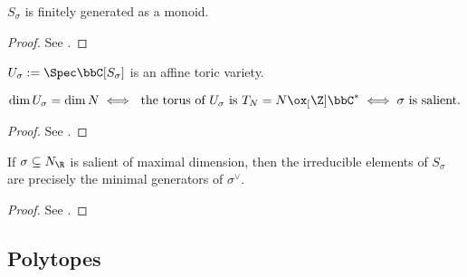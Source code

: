 \begin{proposition}
  \label{07-gordan-lemma}

  $S_\sigma$ is finitely generated as a monoid.
\end{proposition}
\begin{proof}

  See \cite{Cox_2011}.
\end{proof}


\begin{definition}
  \label{08-aff-tor-var-rat-polyhedral-cone}

  $U_\sigma := \Spec \bbC[S_\sigma]$ is an affine toric variety.
\end{definition}


\begin{theorem}
  \label{08-dim-aff-tor-var-rat-polyhedral-cone}

  \[
    \dim U_\sigma = \dim N \iff \text{ the torus of $U_\sigma$ is } T_N = N \ox_[\Z] \bbC^* \iff \sigma \text{ is salient}.
  \]
\end{theorem}
\begin{proof}

  See \cite{Cox_2011}.
\end{proof}


\begin{proposition}
  \label{02-irred-dual-lat}

  If $\sigma \subseteq N_\R$ is salient of maximal dimension, then the irreducible elements of $S_\sigma$ are precisely the minimal generators of $\sigma^\vee$.
\end{proposition}
\begin{proof}

  See \cite{Cox_2011}.
\end{proof}

\subsection{Polytopes}

